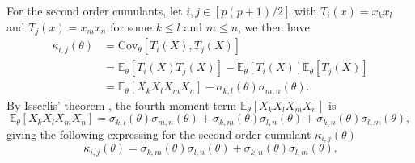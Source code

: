 For the second order cumulants, let $i, j \in [p(p+1)/2]$ with $T_i(x) = x_kx_l$ and $T_j(x) = x_mx_n$ for some $k \leq l$ and $m \leq n$, we then have
\begin{align*}
    \kappa_{i,j}(\theta)
    &= \text{Cov}_\theta\left[T_i(X), T_j(X)\right]\\
    &= \mathbb{E}_\theta\left[T_i(X)T_j(X)\right] - \mathbb{E}_\theta\left[T_i(X)\right]\mathbb{E}_\theta\left[T_j(X)\right]\\
    &= \mathbb{E}_\theta\left[X_kX_lX_mX_n\right] - \sigma_{k, l}(\theta)\sigma_{m, n}(\theta).
\end{align*}
By Isserlis' theorem \cite{Isserlis1918}, the fourth moment term $\mathbb{E}_\theta\left[X_kX_lX_mX_n\right]$ is
\begin{equation*}
    \mathbb{E}_\theta\left[X_kX_lX_mX_n\right] = \sigma_{k,l}(\theta)\sigma_{m,n}(\theta) + \sigma_{k,m}(\theta)\sigma_{l,n}(\theta) + \sigma_{k,n}(\theta)\sigma_{l,m}(\theta),
\end{equation*}
giving the following expressing for the second order cumulant $\kappa_{i,j}(\theta)$
\begin{equation*}
    \kappa_{i,j}(\theta) = \sigma_{k,m}(\theta)\sigma_{l,n}(\theta) + \sigma_{k,n}(\theta)\sigma_{l,m}(\theta).
\end{equation*}